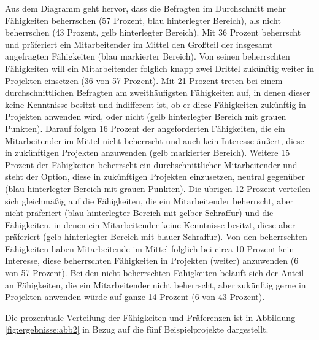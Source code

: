 Aus dem Diagramm geht hervor, dass die Befragten im Durchschnitt mehr Fähigkeiten beherrschen (57 Prozent, blau hinterlegter Bereich), als nicht beherrschen (43 Prozent, gelb hinterlegter Bereich).
Mit 36 Prozent beherrscht und präferiert ein Mitarbeitender im Mittel den Großteil der insgesamt angefragten Fähigkeiten (blau markierter Bereich).
Von seinen beherrschten Fähigkeiten will ein Mitarbeitender folglich knapp zwei Drittel zukünftig weiter in Projekten einsetzen (36 von 57 Prozent).
Mit 21 Prozent treten bei einem durchschnittlichen Befragten am zweithäufigsten Fähigkeiten auf, in denen dieser keine Kenntnisse besitzt und indifferent ist, ob er diese Fähigkeiten zukünftig in Projekten anwenden wird, oder nicht (gelb hinterlegter Bereich mit grauen Punkten).
Darauf folgen 16 Prozent der angeforderten Fähigkeiten, die ein Mitarbeitender im Mittel nicht beherrscht und auch kein Interesse äußert, diese in zukünftigen Projekten anzuwenden (gelb markierter Bereich).
Weitere 15 Prozent der Fähigkeiten beherrscht ein durchschnittlicher Mitarbeitender und steht der Option, diese in zukünftigen Projekten einzusetzen, neutral gegenüber (blau hinterlegter Bereich mit grauen Punkten). 
Die übrigen 12 Prozent verteilen sich gleichmäßig auf die Fähigkeiten, die ein Mitarbeitender beherrscht, aber nicht präferiert (blau hinterlegter Bereich mit gelber Schraffur) und die Fähigkeiten, in denen ein Mitarbeitender keine Kenntnisse besitzt, diese aber präferiert (gelb hinterlegter Bereich mit blauer Schraffur).
Von den beherrschten Fähigkeiten haben Mitarbeitende im Mittel folglich bei circa 10 Prozent kein Interesse, diese beherrschten Fähigkeiten in Projekten (weiter) anzuwenden (6 von 57 Prozent).
Bei den nicht-beherrschten Fähigkeiten beläuft sich der Anteil an Fähigkeiten, die ein Mitarbeitender nicht beherrscht, aber zukünftig gerne in Projekten anwenden würde auf ganze 14 Prozent (6 von 43 Prozent).

Die prozentuale Verteilung der Fähigkeiten und Präferenzen ist in Abbildung \ref{fig:ergebnisse:abb2} in Bezug auf die fünf Beispielprojekte dargestellt.

